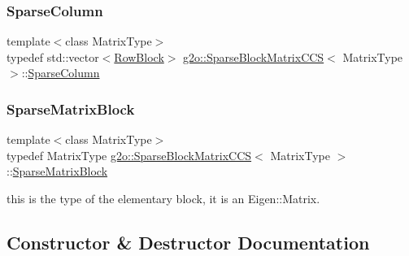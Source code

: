 \subsubsection{\texorpdfstring{Sparse\+Column}{SparseColumn}}
{\footnotesize\ttfamily template$<$class Matrix\+Type$>$ \\
typedef std\+::vector$<$\mbox{\hyperlink{structg2o_1_1_sparse_block_matrix_c_c_s_1_1_row_block}{Row\+Block}}$>$ \mbox{\hyperlink{classg2o_1_1_sparse_block_matrix_c_c_s}{g2o\+::\+Sparse\+Block\+Matrix\+C\+CS}}$<$ Matrix\+Type $>$\+::\mbox{\hyperlink{classg2o_1_1_sparse_block_matrix_c_c_s_a4fc5dfe0a9ff9bd62065ca4b17f25bc1}{Sparse\+Column}}}

\mbox{\label{classg2o_1_1_sparse_block_matrix_c_c_s_a41ea1c8c9d94a25544903ae8345c0354}} 
\subsubsection{\texorpdfstring{Sparse\+Matrix\+Block}{SparseMatrixBlock}}
{\footnotesize\ttfamily template$<$class Matrix\+Type$>$ \\
typedef Matrix\+Type \mbox{\hyperlink{classg2o_1_1_sparse_block_matrix_c_c_s}{g2o\+::\+Sparse\+Block\+Matrix\+C\+CS}}$<$ Matrix\+Type $>$\+::\mbox{\hyperlink{classg2o_1_1_sparse_block_matrix_c_c_s_a41ea1c8c9d94a25544903ae8345c0354}{Sparse\+Matrix\+Block}}}



this is the type of the elementary block, it is an Eigen\+::\+Matrix. 



\subsection{Constructor \& Destructor Documentation}
\mbox{\label{classg2o_1_1_sparse_block_matrix_c_c_s_abaeeb7ad0ba28f37dba85601882806f1}} 
